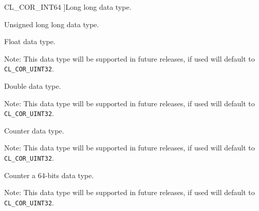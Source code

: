 \begin{Desc}
\begin{description}
{\hypertarget{group__group13_gga325a107}{
CL\_\-COR\_\-INT64}
\label{group__group13_gga325a107}
}]Long long data type. \item[{\em 
\hypertarget{group__group13_gga325a108}{
CL\_\-COR\_\-UINT64}
\label{group__group13_gga325a108}
}]Unsigned long long data type. \item[{\em 
\hypertarget{group__group13_gga325a109}{
CL\_\-COR\_\-FLOAT}
\label{group__group13_gga325a109}
}]Float data type. \begin{Desc}
\item[Note:]This data type will be supported in future releases, if used will default to {\tt CL\_\-COR\_\-UINT32}. \end{Desc}
\item[{\em 
\hypertarget{group__group13_gga325a110}{
CL\_\-COR\_\-DOUBLE}
\label{group__group13_gga325a110}
}]Double data type. \begin{Desc}
\item[Note:]This data type will be supported in future releases, if used will default to {\tt CL\_\-COR\_\-UINT32}. \end{Desc}
\item[{\em 
\hypertarget{group__group13_gga325a111}{
CL\_\-COR\_\-COUNTER32}
\label{group__group13_gga325a111}
}]Counter data type. \begin{Desc}
\item[Note:]This data type will be supported in future releases, if used will default to {\tt CL\_\-COR\_\-UINT32}. \end{Desc}
\item[{\em 
\hypertarget{group__group13_gga325a112}{
CL\_\-COR\_\-COUNTER64}
\label{group__group13_gga325a112}
}]Counter a 64-bits data type. \begin{Desc}
\item[Note:]This data type will be supported in future releases, if used will default to {\tt CL\_\-COR\_\-UINT32}. \end{Desc}

\end{description}
\end{Desc}
